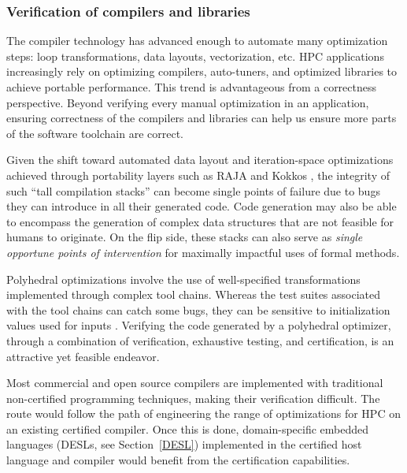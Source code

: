\subsubsection{Verification of compilers and libraries }
\label{subsec:compilers-libraries}

The compiler technology has advanced enough to automate many optimization steps: loop transformations, data layouts, vectorization, etc. HPC applications increasingly rely on optimizing compilers, auto-tuners, and optimized libraries to achieve portable performance. This trend is advantageous from a correctness perspective. Beyond verifying every manual optimization in an application, ensuring correctness of the compilers and libraries can help us ensure more parts of the software toolchain are correct.

Given the shift toward automated data layout
and iteration-space optimizations achieved through
portability layers such as 
RAJA \cite{RAJA-LLNL-TR}
and 
Kokkos \cite{DBLP:journals/jpdc/EdwardsTS14},
the integrity of such ``tall compilation stacks'' 
can become single points of failure
due to bugs they can introduce in
all their generated code. 
%
Code
generation may also be able to encompass
the generation of complex data structures that are not feasible for humans to originate.
%
On the flip side, these stacks can also serve
as
{\em single opportune points of intervention}
for maximally impactful uses of formal methods.

{}

Polyhedral optimizations involve the use of well-specified transformations implemented through complex tool chains. Whereas the test suites associated with the tool chains can catch some bugs, they can be sensitive to initialization values used for inputs \cite{DBLP:conf/popl/BaoKPRS16,schordan2014verification}. Verifying the code generated by a polyhedral optimizer, through a combination of verification, exhaustive testing, and certification, is an attractive yet feasible endeavor.

  Most commercial and open source compilers are implemented with traditional non-certified programming techniques, making their verification difficult.  The route would follow the path of engineering the range of optimizations for HPC on an existing certified compiler. Once this is done, domain-specific embedded languages (DESLs, see Section~\ref{DESL}) implemented in the certified host language and compiler would benefit from the certification capabilities.


